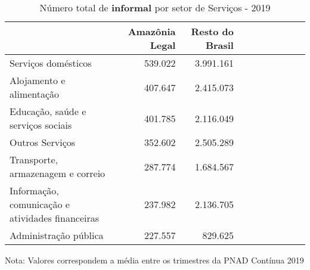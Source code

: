 \begin{table}[H]
\centering
\label{\_retrato\_emprego\_setor\_gape\_table\_n\_de\_informal}
\begin{threeparttable}
\caption{Número total de \textbf{informal} por setor de Serviços - 2019}
\begin{tabular}{l*{3}{rrr}}
\midrule \midrule
                    &Amazônia Legal&Resto do Brasil\\
\midrule
Serviços domésticos&     539.022&   3.991.161\\
Alojamento e alimentação&     407.647&   2.415.073\\
Educação, saúde e serviços sociais&     401.785&   2.116.049\\
Outros Serviços    &     352.602&   2.505.289\\
Transporte, armazenagem e correio&     287.774&   1.684.567\\
Informação, comunicação e atividades financeiras&     237.982&   2.136.705\\
Administração pública&     227.557&     829.625\\
\bottomrule
\end{tabular}
\begin{tablenotes}
\scriptsize{Nota: Valores correspondem a média entre os trimestres da PNAD Contínua 2019}
\end{tablenotes}
\end{threeparttable}
\end{table}
